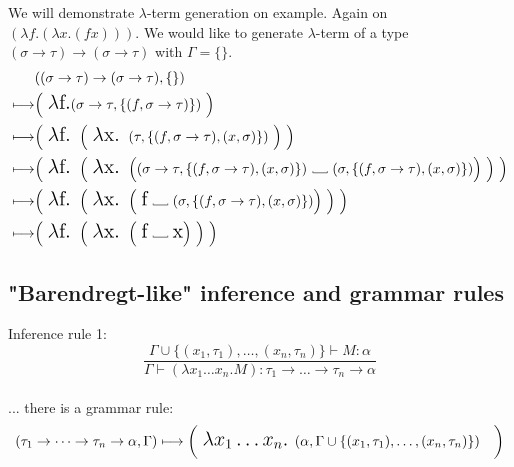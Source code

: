 \documentclass[12pt,a4paper]{report}
\newcommand\Vtextvisiblespace[1][.3em]{%
  \mbox{\kern.06em\vrule height.3ex}%
  \vbox{\hrule width#1}%
  \hbox{\vrule height.3ex}}
\begin{document}
We will demonstrate $\lambda$-term generation on example. 
Again on $(\lambda f . (\lambda x . (f x) ))$. 
We would like to generate $\lambda$-term of a type 
$(\sigma \rightarrow \tau) \rightarrow (\sigma \rightarrow \tau)$
with $\Gamma = \{\}$.
\begin{align*}
	& ((\sigma \rightarrow \tau) \rightarrow (\sigma \rightarrow \tau),\{\}) \\ 
	\longmapsto & \Big( \mbox{ {\Large $\lambda$f.}}
	  ( \sigma \rightarrow \tau , \{ (f,\sigma \rightarrow \tau) \} ) 
	~ \Big)
	\\
	\longmapsto & 
	\Big( \mbox{ {\Large $\lambda$f. }}
		\Big( \mbox{ {\Large $\lambda$x. }}
	  	 	( \tau , \{ (f,\sigma \rightarrow \tau) , (x,\sigma) \} ) 
		~ \Big)  	 
	~ \Big)
	\\
	\longmapsto & 
	\Big( \mbox{ {\Large $\lambda$f. }}
		\Big( \mbox{ {\Large $\lambda$x. }}	  	 	
	  	 	\Big( 
	  	 	  ( \sigma \rightarrow \tau , \{ (f,\sigma \rightarrow \tau) , (x,\sigma) \} ) 
			  \mbox{ \Vtextvisiblespace[1em] } 
			  ( \sigma , \{ (f,\sigma \rightarrow \tau) , (x,\sigma) \} )  \Big) 
		~ \Big)  	 
	 ~ \Big)
	\\
	\longmapsto & 
	\Big( \mbox{ {\Large $\lambda$f. }}
		\Big( \mbox{ {\Large $\lambda$x. }}	  	 	
	  	 	\Big( 
	  	 	  \mbox{ {\Large f}} 
			  \mbox{ \Vtextvisiblespace[1em] } 
			  ( \sigma , \{ (f,\sigma \rightarrow \tau) , (x,\sigma) \} ) \Big) 
		~ \Big)  	 
	~ \Big)		
	\\
	\longmapsto & 
	\Big( \mbox{ {\Large $\lambda$f. }}
		\Big( \mbox{ {\Large $\lambda$x. }}	  	 	
	  	 	\Big( 
	  	 	  \mbox{ {\Large f}} 
			  \mbox{ \Vtextvisiblespace[1em] } 
			  \mbox{{\Large x}} \Big) 
		~ \Big)  	 
	~ \Big)
\end{align*}

\subsection{"Barendregt-like" inference and grammar rules}
\label{barlike}

Inference rule 1: 
\[
	\frac{\Gamma \cup \{ (x_1,\tau_1),\dots,(x_n,\tau_n) \} \vdash M : \alpha }
	     {\Gamma \vdash (\lambda x_1 \dots x_n . M) : 
	     \tau_1 \rightarrow \dots \rightarrow \tau_n \rightarrow \alpha }
\]
\\
... there is a grammar rule:
\[ 
	( \tau_1 \rightarrow \dots \rightarrow \tau_n \rightarrow \alpha , \Gamma )  \longmapsto
	\bigg( \mbox{ {\Large 
	$\lambda x_1 \dots x_n .$ 
	}}( \alpha , \Gamma \cup \{ (x_1,\tau_1),\dots,(x_n,\tau_n) \} ) \quad \bigg)
\]
\\
\end{document}
